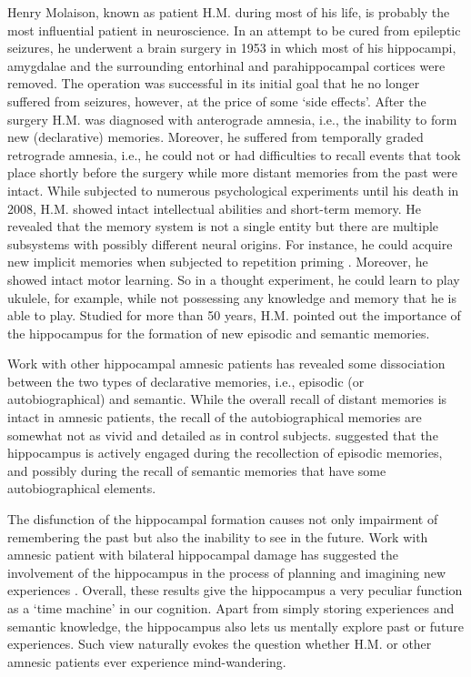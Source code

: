     Henry Molaison, known as patient H.M. during most of his life, is probably
    the most influential patient in neuroscience. In an attempt to be cured
    from epileptic seizures, he underwent a brain surgery in 1953 in which most
    of his hippocampi, amygdalae and the surrounding entorhinal and
    parahippocampal cortices were removed. The operation was successful in its
    initial goal that he no longer suffered from seizures, however, at the
    price of some `side effects'. After the surgery H.M. was diagnosed with
    anterograde amnesia, i.e., the inability to form new (declarative)
    memories. Moreover, he suffered from temporally graded retrograde amnesia,
    i.e., he could not or had difficulties to recall events that took place
    shortly before the surgery while more distant memories from the past were
    intact. While subjected to numerous psychological experiments until his
    death in 2008, H.M. showed intact intellectual abilities and short-term
    memory. He revealed that the memory system is not a single entity but there
    are multiple subsystems with possibly different neural origins. For
    instance, he could acquire new implicit memories when subjected to
    repetition priming \citep{Corkin2002}. Moreover, he showed intact motor
    learning. So in a thought experiment, he could learn to play ukulele, for
    example, while not possessing any knowledge and memory that he is able to
    play. Studied for more than 50 years, H.M. pointed out the importance of the 
    hippocampus for the formation of new episodic and semantic memories.

    Work with other hippocampal amnesic patients has revealed some
    dissociation between the two types of declarative memories, i.e., episodic
    (or autobiographical) and semantic. While the overall recall of distant
    memories is intact in amnesic patients, the recall of the autobiographical
    memories are somewhat not as vivid and detailed as in control subjects.
    \cite{Moscovitch2005} suggested that the hippocampus is actively engaged
    during the recollection of episodic memories, and possibly during the
    recall of semantic memories that have some autobiographical elements.

    The disfunction of the hippocampal formation causes not only impairment of
    remembering the past but also the inability to see in the future. Work with
    amnesic patient with bilateral hippocampal damage has suggested the
    involvement of the hippocampus in the process of planning and imagining new
    experiences \citep{Klein2002, Hassabis2007}. Overall, these results give
    the hippocampus a very peculiar function as a `time machine' in our
    cognition. Apart from simply storing experiences and semantic knowledge,
    the hippocampus also lets us mentally explore past or future experiences.
    Such view naturally evokes the question whether H.M. or other amnesic
    patients ever experience mind-wandering.

